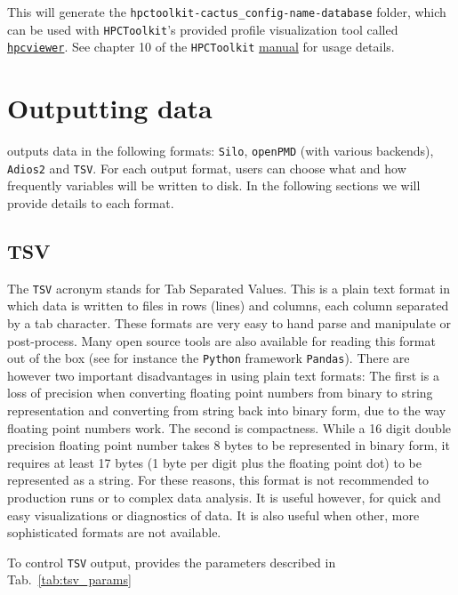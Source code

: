 This will generate the \texttt{hpctoolkit-cactus\_config-name-database} folder, which can be used with \texttt{HPCToolkit}'s provided profile visualization tool called \href{http://hpctoolkit.org/download.html}{\texttt{hpcviewer}}. See chapter 10 of the \texttt{HPCToolkit} \href{http://hpctoolkit.org/manual/HPCToolkit-users-manual.pdf}{manual} for usage details.

\section{Outputting data}
\label{sec:data}

\CarpetX\space outputs data in the following formats: \texttt{Silo}, \texttt{openPMD} (with various backends), \texttt{Adios2} and \texttt{TSV}. For each output format, users can choose what and how frequently variables will be written to disk. In the following sections we will provide details to each format.

\subsection{TSV}
\label{sec:tsv}

The \texttt{TSV} acronym stands for Tab Separated Values. This is a plain text format in which data is written to files in rows (lines) and columns, each column separated by a tab character. These formats are very easy to hand parse and manipulate or post-process. Many open source tools are also available for reading this format out of the box (see for instance the \texttt{Python} framework \texttt{Pandas}). There are however two important disadvantages in using plain text formats: The first is a loss of precision when converting floating point numbers from binary to string representation and converting from string back into binary form, due to the way floating point numbers work. The second is compactness. While a 16 digit double precision floating point number takes 8 bytes to be represented in binary form, it requires at least 17 bytes (1 byte per digit plus the floating point dot) to be represented as a string. For these reasons, this format is not recommended to production runs or to complex data analysis. It is useful however, for quick and easy visualizations or diagnostics of data. It is also useful when other, more sophisticated formats are not available.

To control \texttt{TSV} output, \CarpetX\space provides the parameters described in Tab.~\ref{tab:tsv_params}


